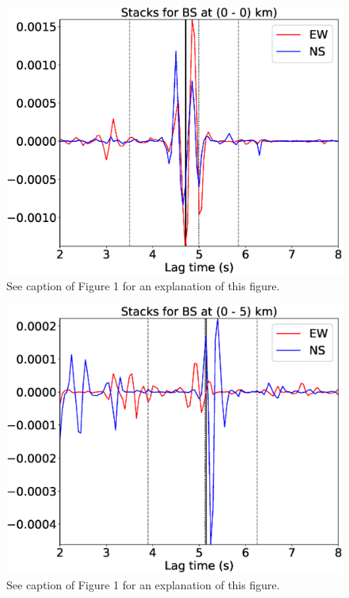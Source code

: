 \documentclass[letterpaper, 12pt]{article}
\begin{document}
\begin{figure}[H]
\includegraphics[width=\linewidth]{figures/intervals/BS_000_000_stacks.eps}
\caption{See caption of Figure 1 for an explanation of this figure.}
\end{figure}

\begin{figure}[H]
\includegraphics[width=\linewidth]{figures/intervals/BS_000_005_stacks.eps}
\caption{See caption of Figure 1 for an explanation of this figure.}
\end{figure}
\end{document}
